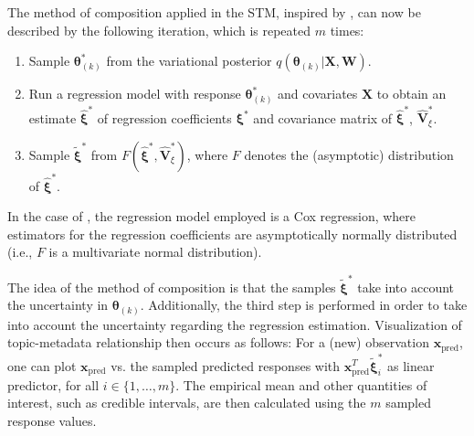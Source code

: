 The method of composition applied in the STM, inspired by \cite{treier2008democracy}, can now be described by the following iteration, which is repeated $m$ times:
\begin{enumerate}
\item Sample $\boldsymbol{\theta}^*_{(k)}$ from the variational posterior $q(\boldsymbol{\theta}_{(k)} | \boldsymbol{X}, \boldsymbol{W})$.
\item Run a regression model with response $\boldsymbol{\theta}^*_{(k)}$ and covariates $\boldsymbol{X}$ to obtain an estimate $\hat{\boldsymbol{\xi}}^*$ of regression coefficients $\boldsymbol{\xi}^*$ and covariance matrix of $\hat{\boldsymbol{\xi}}^*$, $\hat{\boldsymbol{V}}^*_{\xi}$.
\item Sample $\tilde{\boldsymbol{\xi}}^*$ from $F(\hat{\boldsymbol{\xi}}^*, \hat{\boldsymbol{V}}^*_{\xi})$, where $F$ denotes the (asymptotic) distribution of $\hat{\boldsymbol{\xi}}^*$.
\end{enumerate}

In the case of \cite{treier2008democracy}, the regression model employed is a Cox regression, where estimators for the regression coefficients are asymptotically normally distributed (i.e., $F$ is a multivariate normal distribution).

The idea of the method of composition is that the samples $\tilde{\boldsymbol{\xi}}^*$ take into account the uncertainty in $\boldsymbol{\theta}_{(k)}$. Additionally, the third step is performed in order to take into account the uncertainty regarding the regression estimation. Visualization of topic-metadata relationship then occurs as follows: For a (new) observation $\boldsymbol{x}_{\text{pred}}$, one can plot $\boldsymbol{x}_{\text{pred}}$ vs. the sampled predicted responses with $\boldsymbol{x}_{\text{pred}}^T \tilde{\boldsymbol{\xi}}_i^*$ as linear predictor, for all $i \in \{1,\dots,m\}$. The empirical mean and other quantities of interest, such as credible intervals, are then calculated using the $m$ sampled response values.

